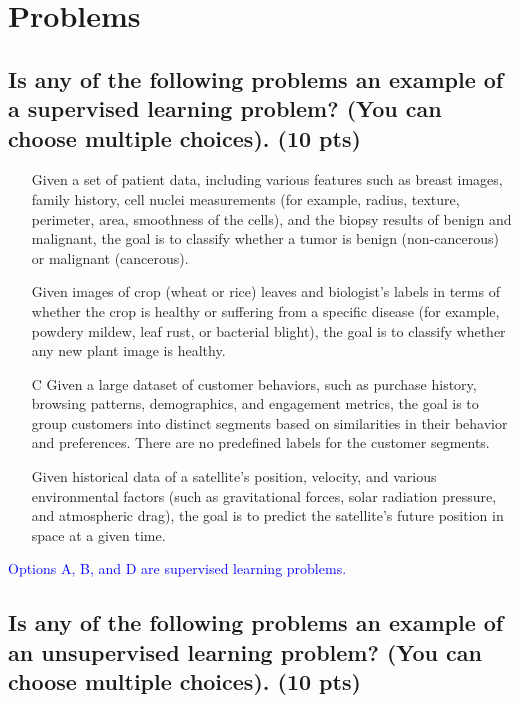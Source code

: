 \section{Problems}
\subsection{Is any of the following problems an example of a supervised learning problem? (You can choose multiple choices). (10 pts)}

\begin{itemize}
    \item[\circledtext{A}] Given a set of patient data, including various features such as breast images, family history, cell nuclei measurements (for example, radius, texture, perimeter, area, smoothness of the cells), and the biopsy results of benign and malignant, the goal is to classify whether a tumor is benign (non-cancerous) or malignant (cancerous).
    \item[\circledtext{B}] Given images of crop (wheat or rice) leaves and biologist’s labels in terms of whether the crop is healthy or suffering from a specific disease (for example, powdery mildew, leaf rust, or bacterial blight), the goal is to classify whether any new plant image is healthy.
    \item[C] Given a large dataset of customer behaviors, such as purchase history, browsing patterns, demographics, and engagement metrics, the goal is to group customers into distinct segments based on similarities in their behavior and preferences. There are no predefined labels for the customer segments.
    \item[\circledtext{D}] Given historical data of a satellite's position, velocity, and various environmental factors (such as gravitational forces, solar radiation pressure, and atmospheric drag), the goal is to predict the satellite's future position in space at a given time.
\end{itemize}

\textcolor{blue}{Options A, B, and D are supervised learning problems.}

\subsection{Is any of the following problems an example of an unsupervised learning problem? (You can choose multiple choices). (10 pts)}


